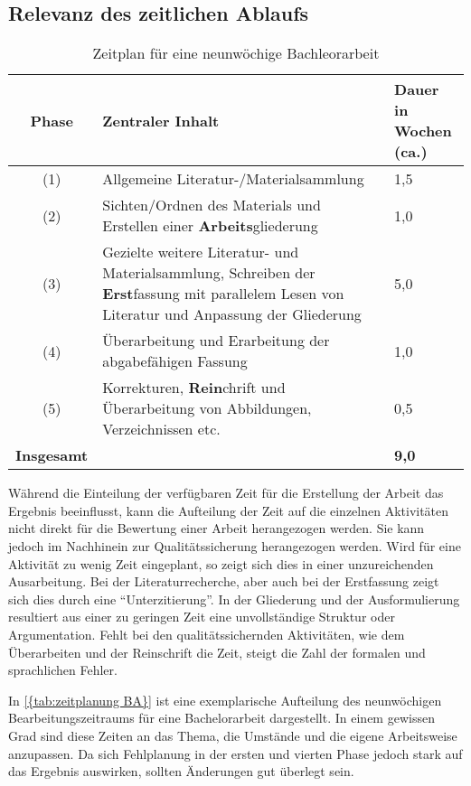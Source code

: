 \subsection{Relevanz des zeitlichen Ablaufs}
\begin{table}[!t]
    \begin{tabular}{c p{9cm} p{3cm}}
        
        \textbf{Phase} & \textbf{Zentraler Inhalt} & \parbox[c]{3cm}{\textbf{Dauer in\\ Wochen (ca.)}} \\ \hline
        (1) & Allgemeine Literatur-/Materialsammlung & 1,5 \\
        (2) & Sichten/Ordnen des Materials und Erstellen einer \textbf{Arbeits}gliederung & 1,0 \\
        (3) & Gezielte weitere Literatur- und Materialsammlung, Schreiben der \textbf{Erst}fassung mit parallelem Lesen von Literatur und Anpassung der Gliederung  & 5,0 \\
        (4) & Überarbeitung und Erarbeitung der abgabefähigen Fassung & 1,0 \\
        (5) & Korrekturen, \textbf{Rein}chrift und Überarbeitung von Abbildungen, Verzeichnissen etc. & 0,5 \\
        \textbf{Insgesamt} & & \textbf{9,0}
    \end{tabular}
    \caption{Zeitplan für eine neunwöchige Bachleorarbeit\cite[entnommen aus][]{Baensch:2013}}\label{{tab:zeitplanung BA}}
\end{table}
Während die Einteilung der verfügbaren Zeit für die Erstellung der Arbeit das Ergebnis beeinflusst, kann die Aufteilung der Zeit auf die einzelnen Aktivitäten nicht direkt für die Bewertung einer Arbeit herangezogen werden. Sie kann jedoch im Nachhinein zur Qualitätssicherung herangezogen werden. Wird für eine Aktivität zu wenig Zeit eingeplant, so zeigt sich dies in einer unzureichenden Ausarbeitung. Bei der Literaturrecherche, aber auch bei der Erstfassung zeigt sich dies durch eine \enquote{Unterzitierung}. In der Gliederung und der Ausformulierung resultiert aus einer zu geringen Zeit eine unvollständige Struktur oder Argumentation. Fehlt bei den qualitätssichernden Aktivitäten, wie dem Überarbeiten und der Reinschrift die Zeit, steigt die Zahl der formalen und sprachlichen Fehler. 

In \autoref{{tab:zeitplanung BA}} ist eine exemplarische Aufteilung des neunwöchigen Bearbeitungszeitraums für eine Bachelorarbeit dargestellt. In einem gewissen Grad sind diese Zeiten an das Thema, die Umstände und die eigene Arbeitsweise anzupassen. Da sich Fehlplanung in der ersten und vierten Phase jedoch stark auf das Ergebnis auswirken, sollten Änderungen gut überlegt sein.\cite[Vgl.][S. 49 f.]{Baensch:2013}

